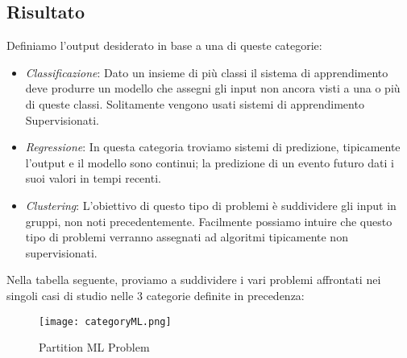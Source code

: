 \documentclass[../tesi.tex]{subfiles}
\begin{document}
\subsection{Risultato}
Definiamo l’output desiderato in base a una di queste categorie:

\begin{itemize}
  \item \textit{Classificazione}: Dato un insieme di più classi il sistema di apprendimento deve produrre un modello che assegni gli input non ancora visti a una o più di queste classi. Solitamente vengono usati sistemi di apprendimento Supervisionati.
  \item \textit{Regressione}: In questa categoria troviamo sistemi di predizione, tipicamente l’output e il modello sono continui; la predizione di un evento futuro dati i suoi valori in tempi recenti.
  \item \textit{Clustering}: L’obiettivo di questo tipo di problemi è suddividere gli input in gruppi, non noti precedentemente. Facilmente possiamo intuire che questo tipo di problemi verranno assegnati ad algoritmi tipicamente non supervisionati.
\end{itemize}

Nella tabella seguente, proviamo a suddividere i vari problemi affrontati nei singoli casi di studio nelle 3 categorie definite in precedenza:
\begin{figure}[htbp]
  \texttt{[image: categoryML.png]}
  \caption{Partition ML Problem} 
  \end{figure}
\newpage
\end{document}
